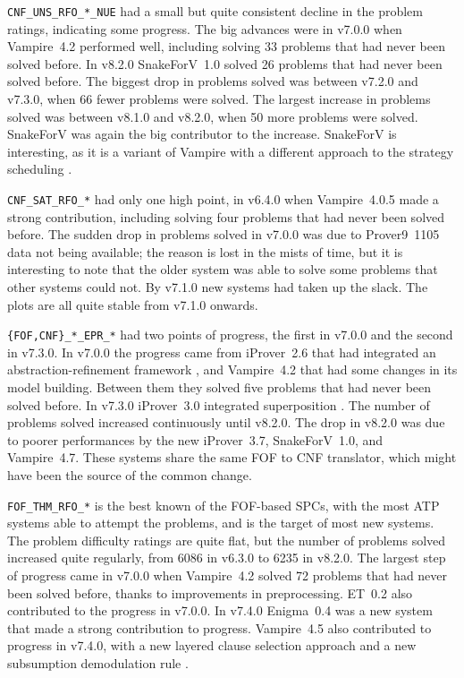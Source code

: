 \documentclass[runningheads]{llncs}
\begin{document}
{\tt CNF\_UNS\_RFO\_*\_NUE} had a small but quite consistent decline in the problem ratings, 
indicating some progress.
The big advances were in v7.0.0 when Vampire~4.2 performed well, including solving 33 problems
that had never been solved before.
In v8.2.0 SnakeForV~1.0 solved 26 problems that had never been solved before.
The biggest drop in problems solved was between v7.2.0 and v7.3.0, when 66 fewer problems were
solved.
The largest increase in problems solved was between v8.1.0 and v8.2.0, when 50 more problems
were solved.
SnakeForV was again the big contributor to the increase.
SnakeForV is interesting, as it is a variant of Vampire with a different approach to the strategy
scheduling \cite{Sud22}.

{\tt CNF\_SAT\_RFO\_*} had only one high point, in v6.4.0 when Vampire~4.0.5 made a strong
contribution, including solving four problems that had never been solved before.
The sudden drop in problems solved in v7.0.0 was due to Prover9~1105 \cite{McC-Prover9-URL}
data not being available; the reason is lost in the mists of time, but it is interesting to note 
that the older system was able to solve some problems that other systems could not.
By v7.1.0 new systems had taken up the slack.
The plots are all quite stable from v7.1.0 onwards.

{\tt \{FOF,CNF\}\_*\_EPR\_*} had two points of progress, the first in v7.0.0 and the second in
v7.3.0.
In v7.0.0 the progress came from iProver~2.6 that had integrated an abstraction-refinement 
framework \cite{HK17}, and Vampire~4.2 that had some changes in its model building.
Between them they solved five problems that had never been solved before.
In v7.3.0 iProver~3.0 integrated superposition \cite{DK20}.
The number of problems solved increased continuously until v8.2.0. 
The drop in v8.2.0 
was due to poorer performances by the new iProver~3.7, SnakeForV~1.0, and Vampire~4.7.
These systems share the same FOF to CNF translator, which might have been the source of the
common change.

{\tt FOF\_THM\_RFO\_*} is the best known of the FOF-based SPCs, with the most ATP systems able 
to attempt the problems, and is the target of most new systems.
The problem difficulty ratings are quite flat, but the number of problems solved increased quite 
regularly, from 6086 in v6.3.0 to 6235 in v8.2.0.
The largest step of progress came in v7.0.0 when Vampire~4.2 solved 72 problems that had never 
been solved before, thanks to improvements in preprocessing.
ET~0.2 \cite{KS+15} also contributed to the progress in v7.0.0.
In v7.4.0 Enigma~0.4 \cite{JU17,JC+20} was a new system that made a strong contribution to 
progress.
Vampire~4.5 also contributed to progress in v7.4.0, with a new layered clause selection approach 
\cite{GS20} and a new subsumption demodulation rule \cite{GKR20}.
\end{document}

